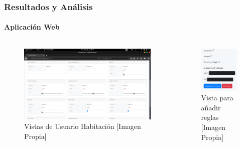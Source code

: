 \begin{frame}[t]
\frametitle{Resultados y Análisis}
\framesubtitle{Aplicación Web}
\begin{columns}
	\begin{figure}[!]
		\centering
		\caption{Vistas de Usuario Habitación [Imagen Propia]}
		\label{fig:userview}
		\includegraphics[width=\linewidth]{Imagenes/UserR_view}
	\end{figure}

	\begin{figure}[!]
		\centering
		\caption{Vista para añadir reglas [Imagen Propia]}
		\label{fig:rulesview}
		\includegraphics[width=0.5\linewidth]{Imagenes/rules_view}
	\end{figure}
\end{columns}
\end{frame}

